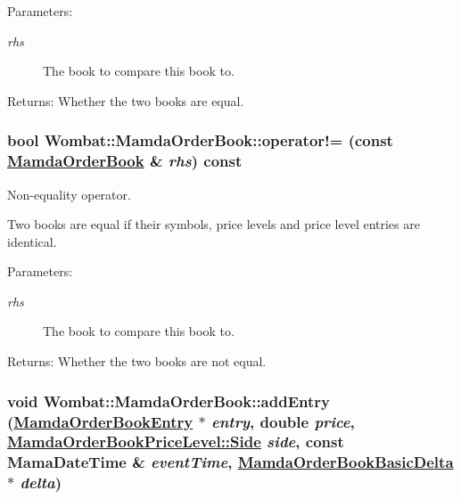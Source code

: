 \begin{Desc}
\item[Parameters:]
\begin{description}
\item[{\em rhs}]The book to compare this book to.\end{description}
\end{Desc}
\begin{Desc}
\item[Returns:]Whether the two books are equal. \end{Desc}
\hypertarget{classWombat_1_1MamdaOrderBook_721c59c8d5e70bef3e1f981b592e486f}{
\subsubsection[operator"!=]{\setlength{\rightskip}{0pt plus 5cm}bool Wombat::Mamda\-Order\-Book::operator!= (const \hyperlink{classWombat_1_1MamdaOrderBook}{Mamda\-Order\-Book} \& {\em rhs}) const}}
\label{classWombat_1_1MamdaOrderBook_721c59c8d5e70bef3e1f981b592e486f}


Non-equality operator. 

Two books are equal if their symbols, price levels and price level entries are identical.

\begin{Desc}
\item[Parameters:]
\begin{description}
\item[{\em rhs}]The book to compare this book to.\end{description}
\end{Desc}
\begin{Desc}
\item[Returns:]Whether the two books are not equal. \end{Desc}
\hypertarget{classWombat_1_1MamdaOrderBook_4b867bc23ef7687fb1ca4112534241f5}{
\subsubsection[addEntry]{\setlength{\rightskip}{0pt plus 5cm}void Wombat::Mamda\-Order\-Book::add\-Entry (\hyperlink{classWombat_1_1MamdaOrderBookEntry}{Mamda\-Order\-Book\-Entry} $\ast$ {\em entry}, double {\em price}, \hyperlink{classWombat_1_1MamdaOrderBookPriceLevel_384c34b0a74d874b8969dee9b0d3718d}{Mamda\-Order\-Book\-Price\-Level::Side} {\em side}, const Mama\-Date\-Time \& {\em event\-Time}, \hyperlink{classWombat_1_1MamdaOrderBookBasicDelta}{Mamda\-Order\-Book\-Basic\-Delta} $\ast$ {\em delta})}}
\label{classWombat_1_1MamdaOrderBook_4b867bc23ef7687fb1ca4112534241f5}


